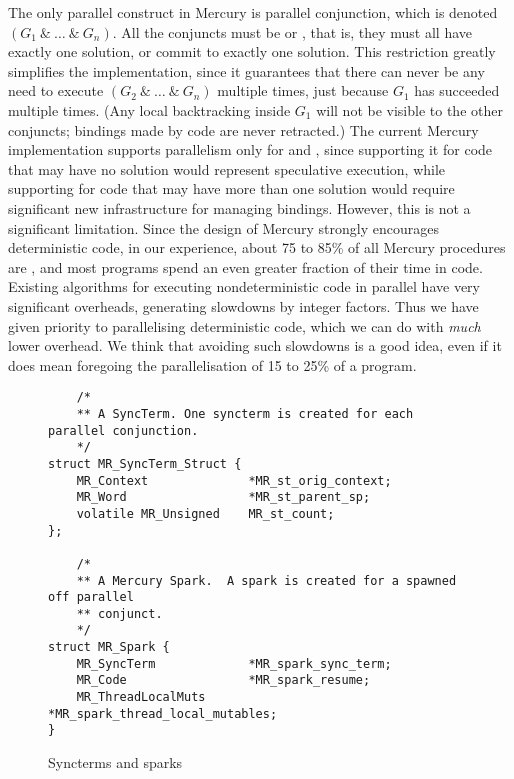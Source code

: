 The only parallel construct in Mercury is parallel conjunction,
which is denoted $(G_1~\&~\ldots~\&~G_n)$.
All the conjuncts must be \ddet or \dccmulti,
that is, they must all have exactly one solution,
or commit to exactly one solution.
This restriction greatly simplifies the implementation,
since it guarantees that there can never be any need
to execute $(G_2~\&~\ldots~\&~G_n)$ multiple times,
just because $G_1$ has succeeded multiple times.
(Any local backtracking inside $G_1$ will not be visible to the other conjuncts;
bindings made by \ddet code are never retracted.)
The current Mercury implementation supports parallelism only for \ddet and \dccmulti,
since supporting it for code that may have no solution
would represent speculative execution,
while supporting for code that may have more than one solution
would require significant new infrastructure for managing bindings.
However, this is not a significant limitation.
Since the design of Mercury strongly encourages deterministic code,
in our experience, about 75 to 85\% of all Mercury procedures are \ddet,
and most programs spend an even greater fraction of their time in \ddet code.
Existing algorithms for executing nondeterministic code in parallel
have very significant overheads, generating slowdowns by integer factors.
Thus we have given priority to parallelising deterministic code,
which we can do with \emph{much} lower overhead.
We think that avoiding such slowdowns is a good idea,
even if it does mean foregoing the parallelisation of 15 to 25\% of a program.

\begin{figure}
\begin{verbatim}
    /*
    ** A SyncTerm. One syncterm is created for each parallel conjunction.
    */
struct MR_SyncTerm_Struct {
    MR_Context              *MR_st_orig_context;
    MR_Word                 *MR_st_parent_sp;
    volatile MR_Unsigned    MR_st_count;
};

    /*
    ** A Mercury Spark.  A spark is created for a spawned off parallel
    ** conjunct.
    */
struct MR_Spark {
    MR_SyncTerm             *MR_spark_sync_term;
    MR_Code                 *MR_spark_resume;
    MR_ThreadLocalMuts      *MR_spark_thread_local_mutables;
}
\end{verbatim}
\caption{Syncterms and sparks}
\label{fig:spark_and_syncterm}
\end{figure}

